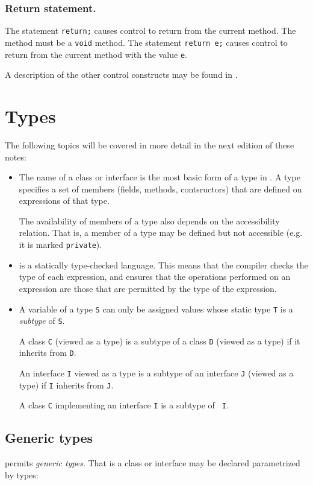 \subsubsection{Return statement.} The statement {\tt return;} causes control to
  return from the current method. The method must be a {\tt void}
  method. The statement {\tt return e;} causes control to return from
  the current method with the value {\tt e}.

A description of the other control constructs may be found in \cite{XtenManual}.

\section{Types}\label{sec:x10-basics-types}
The following topics will be covered in more detail in the next edition of these notes:

\begin{itemize}

  \item The name of a class or interface is the most basic form of a
  type in \Xten. A type specifies a set of members (fields, methods, contsructors) that are
  defined on expressions of that type.

  The availability of members of a type also depends on the
  accessibility relation. That is, a member of a type may be defined
  but not accessible (e.g. it is marked {\tt private}).

\item \Xten{} is a statically type-checked language. This means that
  the compiler checks the type of each expression, and ensures that
  the operations performed on an expression are those that are
  permitted by the type of the expression.  

\item A variable of a type {\tt S} can only be assigned values whose
static type {\tt T} is a {\em subtype} of {\tt S}. 

A class {\tt C} (viewed as a type) is a subtype of a class {\tt D}
(viewed as a type) if it inherits from {\tt D}.  

An interface {\tt I} viewed as a type is a subtype of an interface
{\tt J} (viewed as a type) if {\tt I} inherits from {\tt J}.

A class {\tt C} implementing an interface {\tt I} is a subtype of {\tt
  I}. 
\end{itemize}

\subsection{Generic types}\label{x10-basics-generic-types}
\Xten{} permits {\em generic types}. That is a class or interface may be declared parametrized by types:

